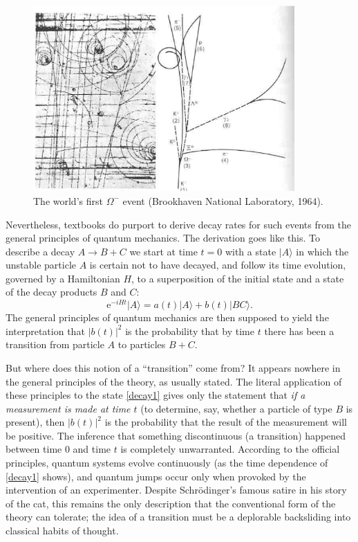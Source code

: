 \documentclass[12pt,a4paper,reqno]{article}
\renewcommand{\(}{\left(}
\renewcommand{\)}{\right)}
\newcommand{\e}{\mbox{e}}
\newcommand{\<}{\langle}
\renewcommand{\>}{\rangle}
\theoremstyle{plain} %
\theoremstyle{definition}
\theoremstyle{remark}
\begin{document}
\begin{figure}
\begin{center}
  \includegraphics[width=10cm]{fig1.eps}
  \caption{The world's first $\Omega^-$ event (Brookhaven National
    Laboratory, 1964).}
\end{center}
\end{figure}

Nevertheless, textbooks do purport to derive decay rates for such events 
from the general principles of quantum mechanics. The derivation goes 
like this. To describe a decay $A \rightarrow B+C$ we start at time $t=0$ 
with a state $|A\> $ in which the unstable particle $A$ is certain 
not to have decayed, and follow its time evolution, governed by a Hamiltonian 
$H$, to a superposition of the initial state and a state of the decay 
products $B$ and $C$:
\begin{equation}\label{decay1}
\e^{-iHt}|A\> = a(t)|A\> + b(t)|BC\> .
\end{equation}
The general principles of quantum mechanics are then supposed to yield 
the interpretation that $|b(t)|^2$ is the probability that by time $t$ 
there has been a  transition from particle $A$ to particles $B+C$. 

But where does this notion of a ``transition'' come from? It appears nowhere 
in the general principles of the theory, as usually stated. The literal 
application of these principles to the state \eqref{decay1} gives only the 
statement that {\em if a measurement is made at time $t$} (to determine, 
say, whether a particle of type $B$ is present), then $|b(t)|^2$ is the 
probability that the result of the measurement will be positive. The inference 
that something discontinuous (a transition) happened between time 0 and 
time $t$ is completely unwarranted. According to the official principles, 
quantum systems evolve continuously (as the time dependence of \eqref{decay1} 
shows), and quantum jumps occur only when provoked by the intervention 
of an experimenter. Despite Schr\"odinger's famous satire in his story 
of the cat, this 
remains the only description that the conventional form of the theory 
can tolerate; the idea of a transition must be a deplorable backsliding 
into classical habits of thought.
\end{document}
